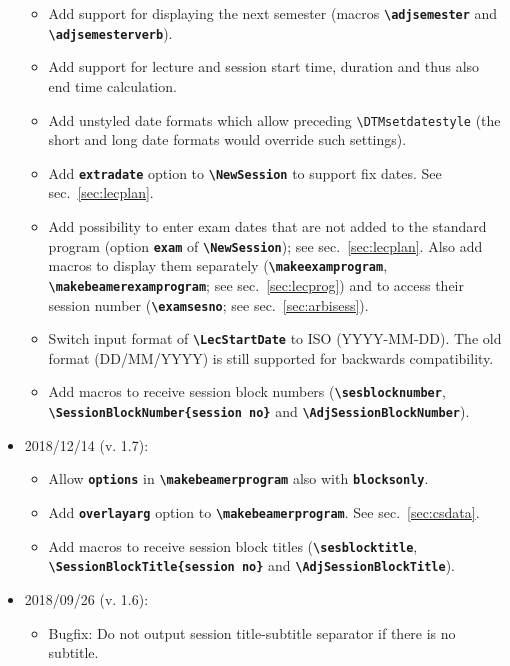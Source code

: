 \documentclass[english]{article}
\newcommand*\jmacro[1]{\textbf{\texttt{#1}}}
\newcommand*\jcsmacro[1]{\jmacro{\textbackslash{#1}}}
\newcommand*\joption[1]{\textbf{\texttt{#1}}}
\newcommand*\jfmacro[1]{\texttt{#1}}
\newcommand*\jfcsmacro[1]{\jfmacro{\textbackslash{#1}}}
\newcommand*\jparam[1]{\angus #1\angud}
\begin{document}
\begin{itemize}
	\begin{itemize}
		\item Add support for displaying the next semester (macros \jcsmacro{adjsemester} and
		      \jcsmacro{adjsemesterverb}).
		\item Add support for lecture and session start time, duration and thus also end time
		      calculation.
		\item Add unstyled date formats which allow preceding \jfcsmacro{DTMsetdatestyle}
		      (the short and long date formats would override such settings).
		\item Add \joption{extradate} option to \jcsmacro{NewSession} to support fix dates.
		      See sec.~\ref{sec:lecplan}.
		\item Add possibility to enter exam dates that are not added to the standard program
		      (option \joption{exam} of \jcsmacro{NewSession}); see sec.~\ref{sec:lecplan}.
		      Also add macros to display them separately (\jcsmacro{makeexamprogram},
		      \jcsmacro{makebeamerexamprogram}; see sec.~\ref{sec:lecprog}) and to
		      access their session number (\jcsmacro{examsesno}; see sec.~\ref{sec:arbisess}).
		\item Switch input format of \jcsmacro{LecStartDate} to ISO (YYYY-MM-DD). The old format
		      (DD/MM/YYYY) is still supported for backwards compatibility.
		\item Add macros to receive session block numbers (\jcsmacro{sesblocknumber},\\
		      \jcsmacro{SessionBlockNumber\{\jparam{session no}\}} and \jcsmacro{AdjSessionBlockNumber}).
	\end{itemize}
\item 2018/12/14 (v. 1.7):
	\begin{itemize}
		\item Allow \joption{options} in \jcsmacro{makebeamerprogram} also with \joption{blocksonly}.
		\item Add \joption{overlayarg} option to \jcsmacro{makebeamerprogram}. See sec.~\ref{sec:csdata}.
		\item Add macros to receive session block titles (\jcsmacro{sesblocktitle},\\
		      \jcsmacro{SessionBlockTitle\{\jparam{session no}\}} and \jcsmacro{AdjSessionBlockTitle}).
	\end{itemize}
\item 2018/09/26 (v. 1.6):
	\begin{itemize}
	    \item Bugfix: Do not output session title-subtitle separator if there is no	subtitle.

\end{itemize}
\end{itemize}
\end{document}
